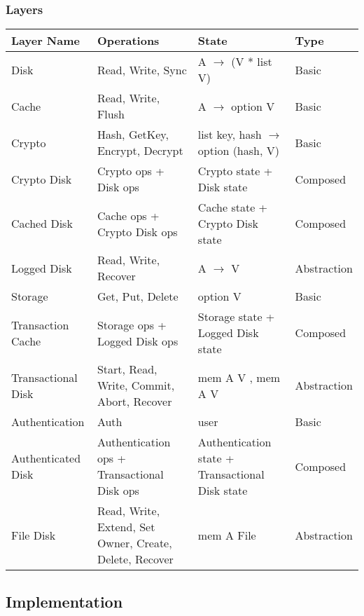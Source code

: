 \documentclass[onecolumn]{paper}
\begin{document}
		\subsubsection{Layers}
			\begin{tabularx}{\linewidth}{|L|L|L|L|}
				\hline
				Layer Name &
				Operations &
				State &
				Type \\
				\hline
				Disk &
				Read, Write, Sync &
				A $\rightarrow$ (V * list V) &
				Basic \\
				\hline
				Cache &
				Read, Write, Flush &
				A $\rightarrow$ option V &
				Basic \\
				\hline
				Crypto &
				Hash, GetKey, Encrypt, Decrypt &
				list key, 
				hash $\rightarrow$ option (hash, V) &
				Basic \\
				\hline
				Crypto Disk &
				Crypto ops + Disk ops &
				Crypto state + Disk state &
				Composed \\
				\hline
				Cached Disk &
				Cache ops + Crypto Disk ops &
				Cache state + Crypto Disk state &
				Composed \\
				\hline
				Logged Disk &
				Read, Write, Recover &
				A $\rightarrow$ V &
				Abstraction \\ 
				\hline
				Storage &
				Get, Put, Delete &
				option V &
				Basic \\
				\hline
				Transaction Cache &
				Storage ops + Logged Disk ops &
				Storage state + Logged Disk state &
				Composed \\
				\hline
				Transactional Disk &
				Start, Read, Write, Commit, Abort, Recover &
				mem A V , mem A V &
				Abstraction \\
				\hline
				Authentication &
				Auth &
				user &
				Basic \\
				\hline
				Authenticated Disk &
				Authentication ops + Transactional Disk ops &
				Authentication state + Transactional Disk state &
				Composed \\
				\hline
				File Disk &
				Read, Write, Extend, Set Owner, Create, Delete, Recover &
				mem A File &
				Abstraction \\
				\hline
			\end{tabularx}
	\subsection{Implementation}
\end{document}
